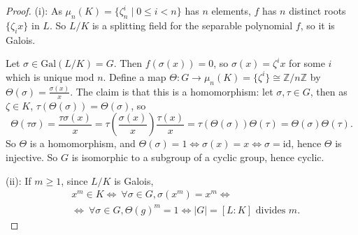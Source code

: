 \documentclass{article}
\theoremstyle{definition}
\begin{document}
\begin{proof}
    (i): As $\mu_n(K) = \{\zeta_n^i \mid 0\le i<n\}$ has $n$ elements, $f$ has $n$ distinct roots $\{\zeta_i x\}$ in $L$. So $L/K$ is a splitting field for the separable polynomial $f$, so it is Galois.

    Let $\sigma \in \text{Gal}(L/K) = G$. Then $f(\sigma(x))=0$, so $\sigma(x) = \zeta^i x$ for some $i$ which is unique mod $n$. Define a map $\Theta : G \to \mu_n(K)=\{\zeta^i\} \cong \mathbb{Z}/n\mathbb{Z}$ by $\Theta(\sigma) = \frac{\sigma(x)}{x}$. The claim is that this is a homomorphism: let $\sigma, \tau \in G$, then as $\zeta \in K$, $\tau(\Theta(\sigma))=\Theta(\sigma)$, so \[
    \Theta(\tau \sigma) = \frac{\tau \sigma(x)}{x} = \tau\left(\frac{\sigma(x)}{x}\right)  \frac{\tau(x)}{x} = \tau(\Theta(\sigma))\Theta(\tau)=\Theta(\sigma)\Theta(\tau).
    \]
    So $\Theta$ is a homomorphism, and $\Theta(\sigma)=1 \iff \sigma(x)=x \iff \sigma=\text{id}$, hence $\Theta$ is injective. So $G$ is isomorphic to a subgroup of a cyclic group, hence cyclic.
    \vspace{1mm}
    
    (ii): If $m\ge 1$, since $L/K$ is Galois,
    \begin{align*}
        &x^m \in K \iff ~\forall \sigma \in G, \sigma(x^m)=x^m \iff\\
        &\iff ~\forall \sigma \in G,\Theta(g)^m = 1 \iff |G|=[L:K] \text{ divides }m.
    \end{align*}
\end{proof}
\end{document}
